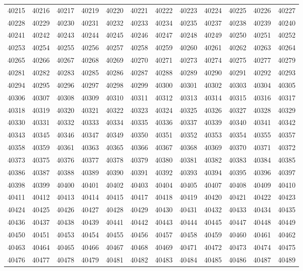 \begin{center}
\begin{longtable}{llllllllllll}
40215 &40216 &40217 &40219 &40220 &40221 &40222 &40223 &40224 &40225 &40226 &40227 \\
40228 &40229 &40230 &40231 &40232 &40233 &40234 &40235 &40237 &40238 &40239 &40240 \\
40241 &40242 &40243 &40244 &40245 &40246 &40247 &40248 &40249 &40250 &40251 &40252 \\
40253 &40254 &40255 &40256 &40257 &40258 &40259 &40260 &40261 &40262 &40263 &40264 \\
40265 &40266 &40267 &40268 &40269 &40270 &40271 &40273 &40274 &40275 &40277 &40279 \\
40281 &40282 &40283 &40285 &40286 &40287 &40288 &40289 &40290 &40291 &40292 &40293 \\
40294 &40295 &40296 &40297 &40298 &40299 &40300 &40301 &40302 &40303 &40304 &40305 \\
40306 &40307 &40308 &40309 &40310 &40311 &40312 &40313 &40314 &40315 &40316 &40317 \\
40318 &40319 &40320 &40321 &40322 &40323 &40324 &40325 &40326 &40327 &40328 &40329 \\
40330 &40331 &40332 &40333 &40334 &40335 &40336 &40337 &40339 &40340 &40341 &40342 \\
40343 &40345 &40346 &40347 &40349 &40350 &40351 &40352 &40353 &40354 &40355 &40357 \\
40358 &40359 &40361 &40363 &40365 &40366 &40367 &40368 &40369 &40370 &40371 &40372 \\
40373 &40375 &40376 &40377 &40378 &40379 &40380 &40381 &40382 &40383 &40384 &40385 \\
40386 &40387 &40388 &40389 &40390 &40391 &40392 &40393 &40394 &40395 &40396 &40397 \\
40398 &40399 &40400 &40401 &40402 &40403 &40404 &40405 &40407 &40408 &40409 &40410 \\
40411 &40412 &40413 &40414 &40415 &40417 &40418 &40419 &40420 &40421 &40422 &40423 \\
40424 &40425 &40426 &40427 &40428 &40429 &40430 &40431 &40432 &40433 &40434 &40435 \\
40436 &40437 &40438 &40439 &40441 &40442 &40443 &40444 &40445 &40447 &40448 &40449 \\
40450 &40451 &40453 &40454 &40455 &40456 &40457 &40458 &40459 &40460 &40461 &40462 \\
40463 &40464 &40465 &40466 &40467 &40468 &40469 &40471 &40472 &40473 &40474 &40475 \\
40476 &40477 &40478 &40479 &40481 &40482 &40483 &40484 &40485 &40486 &40487 &40489 \\

\end{longtable}
\end{center}
